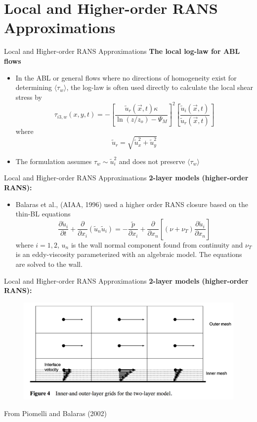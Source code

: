 \section{Local and Higher-order RANS Approximations} %
\begin{frame}{Local and Higher-order RANS Approximations}
\textbf{The local log-law for ABL flows}
\begin{itemize}
	\item In the ABL or general flows where no directions of homogeneity exist for determining
 $\langle \tau_w \rangle$, the log-law is often used directly to calculate the local shear stress by
	$$\tau_{i3,w} (x,y,t) = - \left[ \frac{\tilde{u}_r (\vec{x},t)\kappa}{\ln(z/z_o) - \Psi_M}\right]^2 \left[ \frac{\tilde{u}_i (\vec{x},t)}{\tilde{u}_r (\vec{x},t)}\right]$$
	where
	$$\tilde{u}_r = \sqrt{\tilde{u}_x^2 + \tilde{u}_y^2}$$
	\item The formulation assumes $\tau_w \sim \tilde{u}_i^2$ and does not preserve $\langle \tau_w \rangle$
\end{itemize}
\end{frame}
\begin{frame}{Local and Higher-order RANS Approximations}
\textbf{2-layer models (higher-order RANS):}
\begin{itemize}
	\item Balaras et al., (AIAA, 1996) used a higher order RANS closure based on the thin-BL equations
	$$\frac{\partial \tilde{u}_i}{\partial t} + \frac{\partial}{\partial x_i}(\tilde{u}_n \tilde{u}_i) = -\frac{\tilde{p}}{\partial x_i} + \frac{\partial}{\partial x_n}\left[ (\nu + \nu_T)\frac{\partial \tilde{u}_i}{\partial x_n}\right]$$
	where $i=1,2$, $u_n$ is the wall normal component found from continuity and $\nu_T$ is an eddy-viscosity parameterized with an algebraic model. The equations are solved to the wall.
\end{itemize}
\end{frame}
\begin{frame}{Local and Higher-order RANS Approximations}
\textbf{2-layer models (higher-order RANS):}
\begin{figure}
      \includegraphics[width=\textwidth]{sbc8}
\end{figure}
\centering From Piomelli and Balaras (2002)
\end{frame}
